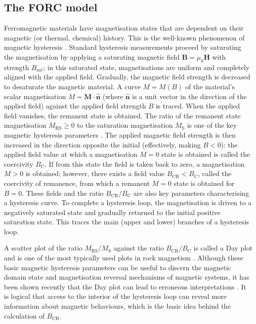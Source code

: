 \subsection{The FORC model}
Ferromagnetic materials have magnetisation states that are dependent on their magnetic (or thermal, chemical) history. This is the well-known phenomenon of magnetic hysteresis \citep{Mayergoyz1986}. Standard hysteresis measurements proceed by saturating the magnetisation by applying a saturating magnetic field $\boldsymbol{B}=\mu_0\boldsymbol{H}$ with strength $B_{\text{sat}}$; in this saturated state, magnetisations are uniform and completely aligned with the applied field. Gradually, the magnetic field strength is decreased to desaturate the magnetic material. A curve $M=M(B)$ of the material's scalar magnetisation $M=\boldsymbol{M}\cdot\boldsymbol{\hat{n}}$ (where $\boldsymbol{\hat{n}}$ is a unit vector in the direction of the applied field) against the applied field strength $B$ is traced. When the applied field vanishes, the remanent state is obtained. The ratio of the remanent state magnetisation $M_{\text{RS}} \geq 0$ to the saturation magnetisation $M_{\text{S}}$ is one of the key magnetic hysteresis parameters \citep{Dunlop}. The applied magnetic field strength is then increased in the direction opposite the initial (effectively, making $B<0$): the applied field value at which a magnetisation $M=0$ state is obtained is called the coercivity $B_\text{C}$. If from this state the field is taken back to zero, a magnetisation $M>0$ is obtained; however, there exists a field value $B_{\text{CR}}<B_{\text{C}}$, called the coercivity of remanence, from which a remanent $M=0$ state is obtained for $B=0$. These fields and the ratio $B_{\text{CR}}/B_{\text{C}}$ are also key parameters characterising a hysteresis curve. To complete a hysteresis loop, the magnetisation is driven to a negatively saturated state and gradually returned to the initial positive saturation state. This traces the main (upper and lower) branches of a hysteresis loop.\par

A scatter plot of the ratio $M_{\text{RS}}/M_{\text{S}}$ against the ratio $B_{\text{CR}}/B_{\text{C}}$ is called a Day plot \citep{Day1977} and is one of the most typically used plots in rock magnetism \citep{Dunlop}. Although these basic magnetic hysteresis parameters can be useful to discern the magnetic domain state and magnetisation reversal mechanisms of magnetic systems, it has been shown recently that the Day plot can lead to erroneous interpretations \citep{Egli2014,Roberts2017}. It is logical that access to the interior of the hysteresis loop can reveal more information about magnetic behaviours, which is the basic idea behind the calculation of $B_{\text{CR}}$.\par

